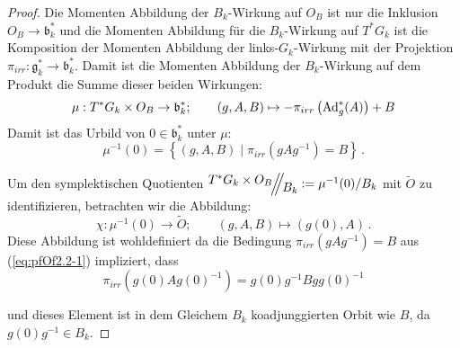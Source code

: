 \begin{proof}
Die Momenten Abbildung der $B_k$-Wirkung auf $O_B$ ist nur die Inklusion
$O_B\to\mathfrak b_k^*$ und die Momenten Abbildung für die $B_k$-Wirkung auf
$T^*G_k$ ist die Komposition der Momenten Abbildung der links-$G_k$-Wirkung mit
der Projektion $\pi_{irr}:\mathfrak g_k^*\to\mathfrak b_k^*$. 
Damit ist die Momenten Abbildung der $B_k$-Wirkung auf dem Produkt die Summe
dieser beiden Wirkungen:
\begin{equation}\label{eq:pfOf2.2-1}
\mu:T^*G_k\times O_B\to \mathfrak b_k^*;\qquad (g,A,B)\mapsto
  -\pi_{irr}\left(\operatorname{Ad}_g^*(A)\right)+B
\end{equation}
Damit ist das Urbild von $0\in\mathfrak b_k^*$ unter $\mu$:
\[
\mu^{-1}(0)=\left\{(g,A,B)\mid\pi_{irr}(gAg^{-1})=B\right\} \,.
\]
\begin{comment}
Sei $(g,A,B)\in T^*G_k\times O_B$ im Kern, also
\begin{align*}
0=\mu((g,A,B))&=-\pi_{irr}\left(\Ad_g^*(A)\right)+B
\\&=-\pi_{irr}\left(gAg^{-1}\right)+B \qquad \text{also} \qquad
    \pi_{irr}\left(gAg^{-1}\right)=B
\end{align*}
\end{comment}
Um den symplektischen Quotienten
$\symplquot{T^*G_k\times O_B}{B_k}:=\mu^{-1}(0)/B_k$
mit $\tilde O$ zu identifizieren, betrachten wir die Abbildung:
\[
\chi:\mu^{-1}(0)\to\tilde O;\qquad(g,A,B)\mapsto(g(0),A)\,.
\]
Diese Abbildung ist wohldefiniert da die Bedingung $\pi_{irr}(gAg^{-1})=B$ aus
(\ref{eq:pfOf2.2-1}) impliziert, dass
\[
\pi_{irr}(g(0)Ag(0)^{-1})=g(0)g^{-1}Bgg(0)^{-1}
\]
\begin{comment}
\begin{align*}
\pi_{irr}(g(0)Ag(0)^{-1})
  &=g(0)\pi_{irr}(A)g(0)^{-1}
\\&=g(0)\pi_{irr}(g^{-1}gAg^{-1}g)g(0)^{-1}
\\&=g(0)g^{-1}\pi_{irr}(gAg^{-1})gg(0)^{-1}
\\&=g(0)g^{-1}Bgg(0)^{-1}
\end{align*}
\end{comment}
und dieses Element ist in dem Gleichem $B_k$ koadjunggierten Orbit wie $B$, da
$g(0)g^{-1}\in B_k$.
\begin{comment}
\begin{align*}
g(0)g^{-1}
  &=g(0)\left(g(0)+g_i\xi^1+\dots+g_k\xi^k\right)^{-1}
\\&\overset{\text{\color{red}?}}=
    g(0)\left(g(0)^{-1}+(g_i)^{-1}\xi^1+\dots+(g_k)^{-1}\xi^k\right)

\end{comment}
\end{proof}
